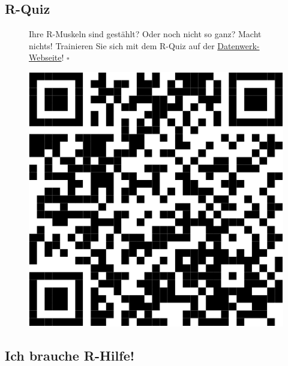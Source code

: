 \documentclass[
  letterpaper,
  twoside,
  open=any]{scrbook}
\theoremstyle{definition}
\theoremstyle{definition}
\theoremstyle{definition}
\theoremstyle{remark}
\begin{document}
\subsection{R-Quiz}\label{r-quiz}

\begin{figure}

\begin{minipage}{0.80\linewidth}
Ihre R-Muskeln sind gestählt? Oder noch nicht so ganz? Macht nichts!
Trainieren Sie sich mit dem R-Quiz auf der
\href{https://sebastiansauer.github.io/Datenwerk/posts/r-quiz/r-quiz}{Datenwerk-Webseite}!
\(\square\)\end{minipage}%
%
\begin{minipage}{0.20\linewidth}

\begin{center}
\includegraphics[width=0.75\linewidth,height=\textheight,keepaspectratio]{020-R_files/figure-pdf/unnamed-chunk-24-1.pdf}
\end{center}

\end{minipage}%

\end{figure}%

\subsection{Ich brauche R-Hilfe!}\label{r-faq}
\end{document}
